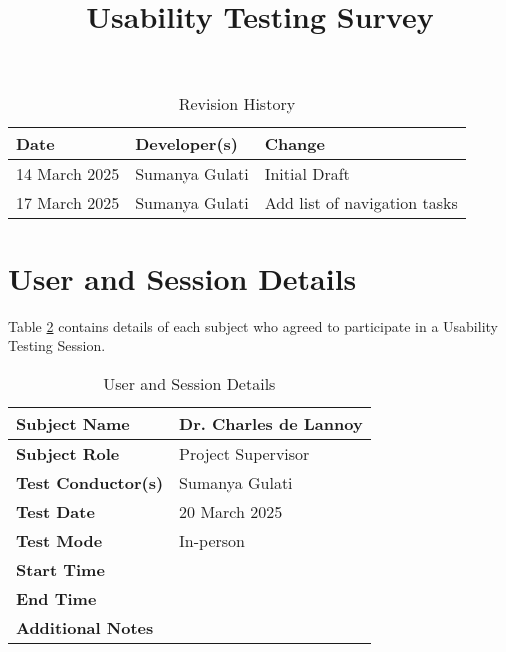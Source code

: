 \documentclass{article}
\title{Usability Testing Survey\\\progname}
\author{\authname}
\date{}
\begin{document}
\maketitle

\begin{table}[hp]
\caption{Revision History} \label{TblRevisionHistory}
\begin{tabularx}{\textwidth}{llX}
\toprule
\textbf{Date} & \textbf{Developer(s)} & \textbf{Change}\\
\midrule
14 March 2025 & Sumanya Gulati & Initial Draft\\
17 March 2025 & Sumanya Gulati & Add list of navigation tasks\\
\bottomrule
\end{tabularx}
\end{table}

\newpage

\section{User and Session Details}
Table \ref{UserDetails} contains details of each subject who agreed to participate in a 
Usability Testing Session.
\begin{table}[hp]
\begin{tabularx}{\textwidth}{l | X}
\toprule
\textbf{Subject Name} & Dr. Charles de Lannoy \\
\midrule
\textbf{Subject Role} & Project Supervisor \\
\midrule
\textbf{Test Conductor(s)} & Sumanya Gulati \\
\midrule
\textbf{Test Date} & 20 March 2025 \\
\midrule
\textbf{Test Mode} & In-person \\
\midrule
\textbf{Start Time} &  \\
\midrule
\textbf{End Time} &  \\
\midrule
\textbf{Additional Notes} &  \\
\bottomrule
\end{tabularx}
\caption{User and Session Details} \label{UserDetails}
\end{table}
\end{document}

